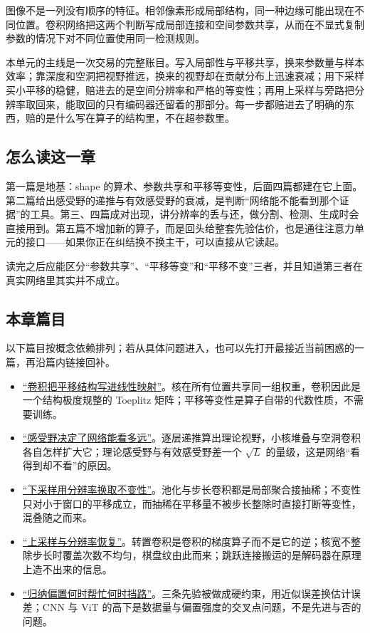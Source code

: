 图像不是一列没有顺序的特征。相邻像素形成局部结构，同一种边缘可能出现在不同位置。卷积网络把这两个判断写成局部连接和空间参数共享，从而在不显式复制参数的情况下对不同位置使用同一检测规则。

本单元的主线是一次交易的完整账目。写入局部性与平移共享，换来参数量与样本效率；靠深度和空洞把视野推远，换来的视野却在贡献分布上迅速衰减；用下采样买小平移的稳健，赔进去的是空间分辨率和严格的等变性；再用上采样与旁路把分辨率取回来，能取回的只有编码器还留着的那部分。每一步都赔进去了明确的东西，赔的是什么写在算子的结构里，不在超参数里。

\subsection{怎么读这一章}

第一篇是地基：shape 的算术、参数共享和平移等变性，后面四篇都建在它上面。第二篇给出感受野的递推与有效感受野的衰减，是判断``网络能不能看到那个证据''的工具。第三、四篇成对出现，讲分辨率的丢与还，做分割、检测、生成时会直接用到。第五篇不增加新的算子，而是回头给整套先验估价，也是通往注意力单元的接口——如果你正在纠结换不换主干，可以直接从它读起。

读完之后应能区分``参数共享''、``平移等变''和``平移不变''三者，并且知道第三者在真实网络里其实并不成立。

\subsection{本章篇目}

以下篇目按概念依赖排列；若从具体问题进入，也可以先打开最接近当前困惑的一篇，再沿篇内链接回补。

\begin{itemize}
\tightlist
\item \hyperref[sec:14-Deep-Learning/04-Convolutional-Networks/01]{``卷积把平移结构写进线性映射''}。核在所有位置共享同一组权重，卷积因此是一个结构极度规整的 Toeplitz 矩阵；平移等变性是算子自带的代数性质，不需要训练。
\item \hyperref[sec:14-Deep-Learning/04-Convolutional-Networks/02]{``感受野决定了网络能看多远''}。逐层递推算出理论视野，小核堆叠与空洞卷积各自怎样扩大它；理论感受野与有效感受野差一个 \(\sqrt{L}\) 的量级，这是网络``看得到却不看''的原因。
\item \hyperref[sec:14-Deep-Learning/04-Convolutional-Networks/03]{``下采样用分辨率换取不变性''}。池化与步长卷积都是局部聚合接抽稀；不变性只对小于窗口的平移成立，而抽稀在平移量不被步长整除时直接打断等变性，混叠随之而来。
\item \hyperref[sec:14-Deep-Learning/04-Convolutional-Networks/04]{``上采样与分辨率恢复''}。转置卷积是卷积的梯度算子而不是它的逆；核宽不整除步长时覆盖次数不均匀，棋盘纹由此而来；跳跃连接搬运的是解码器在原理上造不出来的信息。
\item \hyperref[sec:14-Deep-Learning/04-Convolutional-Networks/05]{``归纳偏置何时帮忙何时挡路''}。三条先验被做成硬约束，用近似误差换估计误差；CNN 与 ViT 的高下是数据量与偏置强度的交叉点问题，不是先进与否的问题。
\end{itemize}
